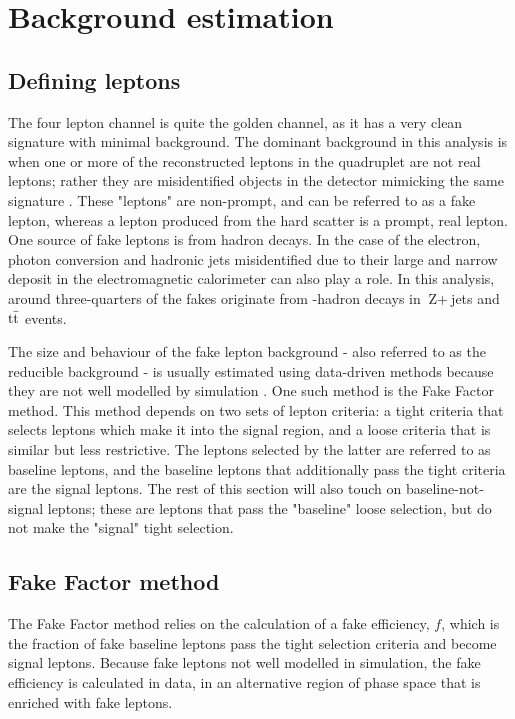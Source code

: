 \section{Background estimation}
\label{sec:background}

\subsection{Defining leptons}

The four lepton channel is quite the golden channel, as it has a very clean signature with minimal background. The dominant background in this analysis is when one or more of the reconstructed leptons in the quadruplet are not real leptons; rather they are misidentified objects in the detector mimicking the same signature \cite{varnes2016poisson}. These "leptons" are non-prompt, and can be referred to as a fake lepton, whereas a lepton produced from the hard scatter is a prompt, real lepton. One source of fake leptons is from hadron decays. In the case of the electron, photon conversion and hadronic jets misidentified due to their large and narrow deposit in the electromagnetic calorimeter can also play a role. In this analysis, around three-quarters of the fakes originate from \Pbottom-hadron decays in $\text{Z}+$jets and $\text{t}\Bar{\text{t}}$ events. 

The size and behaviour of the fake lepton background - also referred to as the reducible background - is usually estimated using data-driven methods because they are not well modelled by simulation \cite{varnes2016poisson}. One such method is the Fake Factor method. This method depends on two sets of lepton criteria: a tight criteria that selects leptons which make it into the signal region, and a loose criteria that is similar but less restrictive. The leptons selected by the latter are referred to as baseline leptons, and the baseline leptons that additionally pass the tight criteria are the signal leptons. The rest of this section will also touch on baseline-not-signal leptons; these are leptons that pass the "baseline" loose selection, but do not make the "signal" tight selection. 

\subsection{Fake Factor method}

The Fake Factor method relies on the calculation of a fake efficiency, $f$, which is the fraction of fake baseline leptons pass the tight selection criteria and become signal leptons. Because fake leptons not well modelled in simulation, the fake efficiency is calculated in data, in an alternative region of phase space that is enriched with fake leptons. 


